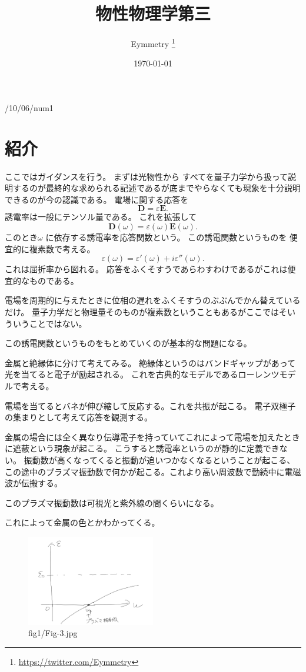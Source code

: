 \documentclass[dvipdfmx]{jsarticle}
\title{物性物理学第三}
\author{Eymmetry \thanks{\url{https://twitter.com/Eymmetry}}}
\date{\today}
\begin{document}
\maketitle

/10/06/num1
\section{紹介}
ここではガイダンスを行う。
まずは光物性から
すべてを量子力学から扱って説明するのが最終的な求められる記述であるが底までやらなくても現象を十分説明できるのが今の認識である。
電場に関する応答を
\[
\bm{D}=\varepsilon \bm{E}
.\] 
誘電率は一般にテンソル量である。
これを拡張して
\[
\bm{D}(\omega)=\varepsilon(\omega)\bm{E}(\omega)
.\] 
このとき$\omega$ に依存する誘電率を応答関数という。
この誘電関数というものを
便宜的に複素数で考える。
\[
\varepsilon(\omega)=\varepsilon'(\omega)+i\varepsilon''(\omega)
.\] 
これは屈折率から図れる。
応答をふくそすうであらわすわけであるがこれは便宜的なものである。

電場を周期的に与えたときに位相の遅れをふくそすうのぶぶんでかん替えているだけ。
量子力学だと物理量そのものが複素数ということもあるがここではそいういうことではない。

この誘電関数というものをもとめていくのが基本的な問題になる。

金属と絶縁体に分けて考えてみる。
絶縁体というのはバンドギャップがあって光を当てると電子が励起される。
これを古典的なモデルであるローレンツモデルで考える。

電場を当てるとバネが伸び縮して反応する。これを共振が起こる。
電子双極子の集まりとして考えて応答を観測する。

金属の場合には全く異なり伝導電子を持っていてこれによって電場を加えたときに遮蔽という現象が起こる。
こうすると誘電率というのが静的に定義できない。
振動数が高くなってくると振動が追いつかなくなるということが起こる、この途中のプラズマ振動数で何かが起こる。これより高い周波数で勤続中に電磁波が伝搬する。

このプラズマ振動数は可視光と紫外線の間くらいになる。

これによって金属の色とかわかってくる。
\begin{figure}[H]
	\centering
	\includegraphics[width=0.5\textwidth]{fig1/Fig-3.jpg}
	\caption{fig1/Fig-3.jpg}
	\label{fig:fig1-Fig-3-jpg}
\end{figure}
\end{document}
